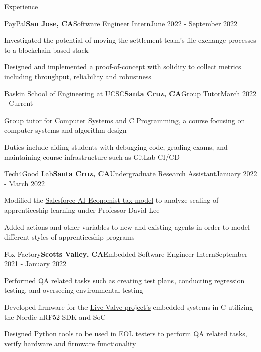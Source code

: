 \documentclass{resume}
\begin{document}
\begin{rSection}{\large Experience}

\begin{rSubsection}{PayPal}{\bf{San Jose, CA}}{Software Engineer Intern}{June 2022 - September 2022}
\item Investigated the potential of moving the settlement team's file exchange processes to a blockchain based stack
\item Designed and implemented a proof-of-concept with solidity to collect metrics including throughput, reliability and robustness
\end{rSubsection}

\begin{rSubsection}{Baskin School of Engineering at UCSC}{\bf{Santa Cruz, CA}}{Group Tutor}{March 2022 - Current}
\item Group tutor for Computer Systems and C Programming, a course focusing on computer systems and algorithm design
\item Duties include aiding students with debugging code, grading exams, and maintaining course infrastructure such as GitLab CI/CD
\end{rSubsection}

\begin{rSubsection}{Tech4Good Lab}{\bf{Santa Cruz, CA}}{Undergraduate Research Assistant}{January 2022 - March 2022}
\item Modified the \href{https://github.com/salesforce/ai-economist}{Salesforce AI Economist tax model} to analyze scaling of apprenticeship learning under Professor David Lee
\item Added actions and other variables to new and existing agents in order to model different styles of apprenticeship programs
\end{rSubsection}

\begin{rSubsection}{Fox Factory}{\bf{Scotts Valley, CA}}{Embedded Software Engineer Intern}{September 2021 - January 2022}
\item Performed QA related tasks such as creating test plans, conducting regression testing, and overseeing environmental testing
\item Developed firmware for the \href{https://www.pinkbike.com/news/fox-updates-live-valve-electonic-suspension-for-2022.html}{Live Valve project's} embedded systems in C utilizing the Nordic nRF52 SDK and SoC
\item Designed Python tools to be used in EOL testers to perform QA related tasks, verify hardware and firmware functionality
\end{rSubsection}


\end{rSection}
\end{document}
